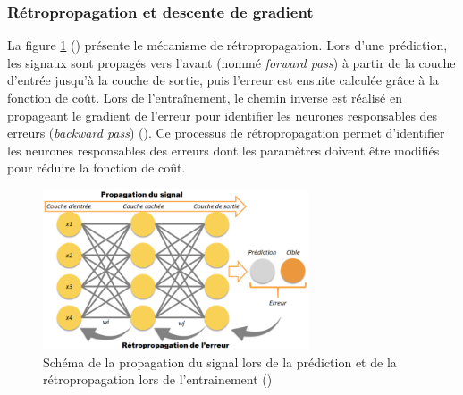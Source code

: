 \subsubsection{Rétropropagation et descente de gradient}
La figure \ref{fig:retropop} (\cite{scalzitti_nouvelle_2021}) présente le mécanisme de rétropropagation. Lors d'une prédiction, les signaux sont propagés vers l'avant (nommé \textit{forward pass}) à partir de la couche d'entrée jusqu'à la couche de sortie, puis l'erreur est ensuite calculée grâce à la fonction de coût. Lors de l'entraînement, le chemin inverse est réalisé en propageant le gradient de l'erreur pour identifier les neurones responsables des erreurs (\textit{backward pass}) (\cite{lecun_deep_2015}). Ce processus de rétropropagation permet d'identifier les neurones responsables des erreurs dont les paramètres doivent être modifiés pour réduire la fonction de coût.
\begin{figure}[!ht]
 \centering
 \includegraphics[width=0.7\textwidth]{figures/retro_propagation.png}
 \caption[Schéma de la rétro-propagation]{Schéma de la propagation du signal lors de la prédiction et de la rétropropagation lors de l'entrainement (\cite{scalzitti_nouvelle_2021})}
 \label{fig:retropop}
\end{figure}


